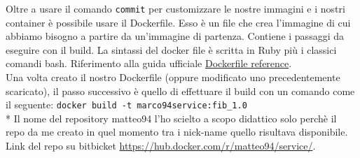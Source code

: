 Oltre a usare il comando \texttt{commit} per customizzare le nostre immagini e i nostri container è possibile usare il Dockerfile. Esso è un file che crea l'immagine di cui abbiamo bisogno a partire da un'immagine di partenza. Contiene i passaggi da eseguire con il build. La sintassi del docker file è scritta in Ruby più i classici comandi bash.
Riferimento alla guida ufficiale \href{https://docs.docker.com/engine/reference/builder/}{Dockerfile reference}.\\
Una volta creato il nostro Dockerfile (oppure modificato uno precedentemente scaricato), il passo successivo è quello di effettuare il build con un comando come il seguente:
\texttt{docker build -t marco94\/service:fib\_1.0}\\
* Il nome del repository matteo94 l'ho scielto a scopo didattico solo perchè il repo da me creato in quel momento tra i nick-name quello risultava disponibile.
Link del repo su bitbicket \href{https://hub.docker.com/r/matteo94/service/}{https://hub.docker.com/r/matteo94/service/}.
